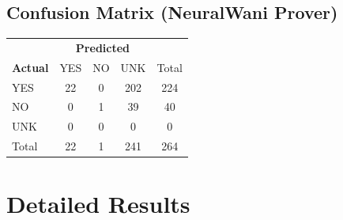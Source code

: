 \documentclass[a4paper,10pt]{article}
\begin{document}
\subsection{Confusion Matrix (NeuralWani Prover)}

\begin{tabular}{l|ccc|c}
\toprule
 & \multicolumn{3}{c|}{\textbf{Predicted}} & \\
\textbf{Actual} & YES & NO & UNK & Total \\
\midrule
YES & 22 & 0 & 202 & 224 \\
NO & 0 & 1 & 39 & 40 \\
UNK & 0 & 0 & 0 & 0 \\
\midrule
Total & 22 & 1 & 241 & 264 \\
\bottomrule
\end{tabular}



\section{Detailed Results}
\end{document}
